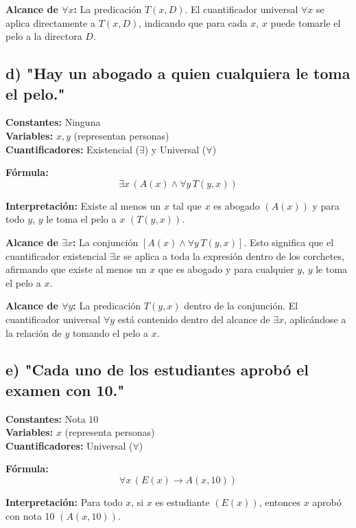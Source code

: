 \documentclass[11pt,letterpaper]{article}
\begin{document}
\textbf{ Alcance de \( \forall x \):}
La predicación \( T(x, D) \). El cuantificador universal \( \forall x \) se aplica directamente a \( T(x, D) \), indicando que para cada \( x \), \( x \) puede tomarle el pelo a la directora \( D \).

\subsection*{d) "Hay un abogado a quien cualquiera le toma el pelo."}

\textbf{Constantes:} Ninguna \\
\textbf{Variables:} \( x, y \) (representan personas) \\
\textbf{Cuantificadores:} Existencial (\( \exists \)) y Universal (\( \forall \))

\textbf{Fórmula:}
\[
\exists x \, (A(x) \land \forall y \, T(y, x))
\]

\textbf{Interpretación:} Existe al menos un \( x \) tal que \( x \) es abogado \( (A(x)) \) y para todo \( y \), \( y \) le toma el pelo a \( x \) \( (T(y, x)) \).

\textbf{Alcance de \( \exists x \):}
La conjunción \( [A(x) \land \forall y \, T(y, x)] \). Esto significa que el cuantificador existencial \( \exists x \) se aplica a toda la expresión dentro de los corchetes, afirmando que existe al menos un \( x \) que es abogado y para cualquier \( y \), \( y \) le toma el pelo a \( x \).

\textbf{Alcance de \( \forall y \):} La predicación \( T(y, x) \) dentro de la conjunción. El cuantificador universal \( \forall y \) está contenido dentro del alcance de \( \exists x \), aplicándose a la relación de \( y \) tomando el pelo a \( x \).


\subsection*{e) "Cada uno de los estudiantes aprobó el examen con 10."}

\textbf{Constantes:} Nota \( 10 \) \\
\textbf{Variables:} \( x \) (representa personas) \\
\textbf{Cuantificadores:} Universal (\( \forall \))

\textbf{Fórmula:}
\[
\forall x \, (E(x) \rightarrow A(x, 10))
\]

\textbf{Interpretación:} Para todo \( x \), si \( x \) es estudiante \( (E(x)) \), entonces \( x \) aprobó con nota 10 \( (A(x, 10)) \).
\end{document}
